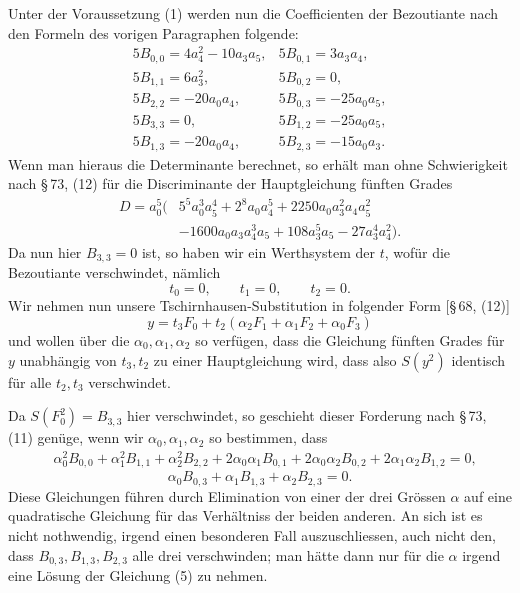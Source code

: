 \documentclass[11pt]{article}
\begin{document}
Unter der Voraussetzung (1) werden nun die Coefficienten der Bezoutiante nach den Formeln des vorigen Paragraphen folgende:
\begin{equation}
\begin{array}{ll}
5B_{0,0}=4a_4^2-10a_3a_5, & 5B_{0,1}=3a_3a_4,\\
5B_{1,1}=6a_3^2, & 5B_{0,2}=0,\\
5B_{2,2}=-20a_0a_4, & 5B_{0,3}=-25a_0a_5,\\
5B_{3,3}=0, & 5B_{1,2}=-25a_0a_5,\\
5B_{1,3}=-20a_0a_4, & 5B_{2,3}=-15a_0a_3.
\end{array}
\tag{2}
\end{equation}
Wenn man hieraus die Determinante berechnet, so erhält man ohne Schwierigkeit nach \S\,73, (12) für die Discriminante der Hauptgleichung fünften Grades
\begin{equation}
\begin{aligned}
D=a_0^5(&5^5a_0^3a_5^4+2^8a_0a_4^5+2250a_0a_3^2a_4a_5^2\\
&-1600a_0a_3a_4^3a_5+108a_3^5a_5-27a_3^4a_4^2).
\end{aligned}
\tag{3}
\end{equation}
Da nun hier $B_{3,3}=0$ ist, so haben wir ein Werthsystem der $t$, wofür die Bezoutiante verschwindet, nämlich
\[
 t_0=0,\qquad t_1=0,\qquad t_2=0.
\]
Wir nehmen nun unsere Tschirnhausen-Substitution in folgender Form [\S\,68, (12)]
\begin{equation}
 y=t_3F_0+t_2(\alpha_2F_1+\alpha_1F_2+\alpha_0F_3)
\tag{4}
\end{equation}
und wollen über die $\alpha_0,\alpha_1,\alpha_2$ so verfügen, dass die Gleichung fünften Grades für $y$ unabhängig von $t_3,t_2$ zu einer Hauptgleichung wird, dass also $S(y^2)$ identisch für alle $t_2,t_3$ verschwindet.

Da $S(F_0^2)=B_{3,3}$ hier verschwindet, so geschieht dieser Forderung nach \S\,73, (11) genüge, wenn wir $\alpha_0,\alpha_1,\alpha_2$ so bestimmen, dass
\begin{equation}
\begin{aligned}
&\alpha_0^2B_{0,0}+\alpha_1^2B_{1,1}+\alpha_2^2B_{2,2}
+2\alpha_0\alpha_1B_{0,1}+2\alpha_0\alpha_2B_{0,2}+2\alpha_1\alpha_2B_{1,2}=0,
\end{aligned}
\tag{5}
\end{equation}
\begin{equation}
 \alpha_0B_{0,3}+\alpha_1B_{1,3}+\alpha_2B_{2,3}=0.
\tag{6}
\end{equation}
Diese Gleichungen führen durch Elimination von einer der drei Grössen $\alpha$ auf eine quadratische Gleichung für das Verhältniss der beiden anderen. An sich ist es nicht nothwendig, irgend einen besonderen Fall auszuschliessen, auch nicht den, dass $B_{0,3},B_{1,3},B_{2,3}$ alle drei verschwinden; man hätte dann nur für die $\alpha$ irgend eine Lösung der Gleichung (5) zu nehmen.
\end{document}
